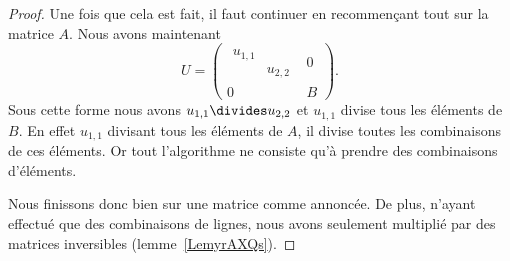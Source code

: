 \begin{proof}
	Une fois que cela est fait, il faut continuer en recommençant tout sur la matrice \( A\). Nous avons maintenant
	\begin{equation}
		U=\begin{pmatrix}
			\begin{matrix}
				u_{1,1} &         \\
				        & u_{2,2}
			\end{matrix} & 0        \\
			0                    & B
		\end{pmatrix}.
	\end{equation}
	Sous cette forme nous avons \( u_{1,1}\divides u_{2,2}\) et \( u_{1,1}\) divise tous les éléments de \( B\). En effet \( u_{1,1}\) divisant tous les éléments de \( A\), il divise toutes les combinaisons de ces éléments. Or tout l'algorithme ne consiste qu'à prendre des combinaisons d'éléments.

	Nous finissons donc bien sur une matrice comme annoncée. De plus, n'ayant effectué que des combinaisons de lignes, nous avons seulement multiplié par des matrices inversibles (lemme~\ref{LemyrAXQs}).
\end{proof}
